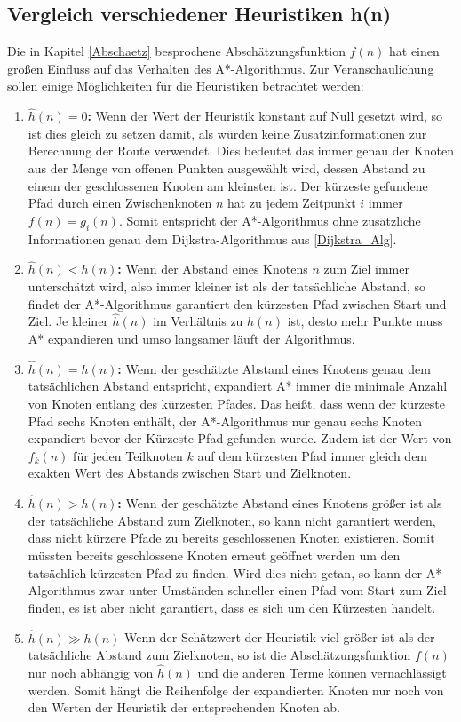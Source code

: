 	\subsection{Vergleich verschiedener Heuristiken h(n)}
		\label{Heuristik}
		Die in Kapitel \ref{Abschaetz} besprochene Abschätzungsfunktion $f(n)$ hat einen großen Einfluss auf das Verhalten des A*-Algorithmus.
		Zur Veranschaulichung sollen einige Möglichkeiten für die Heuristiken betrachtet werden\cite{Patel2016}:
		\begin{enumerate}
			\item \textbf{$\hat{h}(n)=0$:} Wenn der Wert der Heuristik konstant auf Null gesetzt wird, so ist dies gleich zu setzen damit, als würden keine Zusatzinformationen zur Berechnung der Route verwendet. Dies bedeutet das immer genau der Knoten aus der Menge von offenen Punkten ausgewählt wird, dessen Abstand zu einem der geschlossenen Knoten am kleinsten ist. Der kürzeste gefundene Pfad durch einen Zwischenknoten $n$ hat zu jedem Zeitpunkt $i$ immer $f(n)=g_i(n)$. Somit entspricht der A*-Algorithmus ohne zusätzliche Informationen genau dem Dijkstra-Algorithmus aus \ref{Dijkstra_Alg}.
			\item \textbf{$\hat{h}(n)<h(n)$:} Wenn der Abstand eines Knotens $n$ zum Ziel immer unterschätzt wird, also immer kleiner ist als der tatsächliche Abstand, so findet der A*-Algorithmus garantiert den kürzesten Pfad zwischen Start und Ziel. Je kleiner $\hat{h}(n)$ im Verhältnis zu $h(n)$ ist, desto mehr Punkte muss A* expandieren und umso langsamer läuft der Algorithmus.
			\item \textbf{$\hat{h}(n)=h(n)$:} Wenn der geschätzte Abstand eines Knotens genau dem tatsächlichen Abstand entspricht, expandiert A* immer die minimale Anzahl von Knoten entlang des kürzesten Pfades. Das heißt, dass wenn der kürzeste Pfad sechs Knoten enthält, der A*-Algorithmus nur genau sechs Knoten expandiert bevor der Kürzeste Pfad gefunden wurde. Zudem ist der Wert von $f_k(n)$ für jeden Teilknoten $k$ auf dem kürzesten Pfad immer gleich dem exakten Wert des Abstands zwischen Start und Zielknoten.
			\item \textbf{$\hat{h}(n)>h(n)$:} Wenn der geschätzte Abstand eines Knotens größer ist als der tatsächliche Abstand zum Zielknoten, so kann nicht garantiert werden, dass nicht kürzere Pfade zu bereits geschlossenen Knoten existieren.  Somit müssten bereits geschlossene Knoten erneut geöffnet werden um den tatsächlich kürzesten Pfad zu finden. Wird dies nicht getan, so kann der A*-Algorithmus zwar unter Umständen schneller einen Pfad vom Start zum Ziel finden, es ist aber nicht garantiert, dass es sich um den Kürzesten handelt.
			\item \textbf{$\hat{h}(n)\gg h(n)$} Wenn der Schätzwert der Heuristik viel größer ist als der tatsächliche Abstand zum Zielknoten, so ist die Abschätzungsfunktion $f(n)$ nur noch abhängig von $\hat{h}(n)$ und die anderen Terme können vernachlässigt werden. Somit hängt die Reihenfolge der expandierten Knoten nur noch von den Werten der Heuristik der entsprechenden Knoten ab.
		\end{enumerate}
		 
